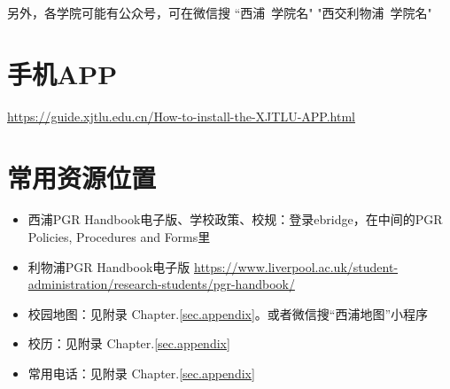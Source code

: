 另外，各学院可能有公众号，可在微信搜 “西浦\ {学院名}" "西交利物浦\ {学院名}"

\section{手机APP}
\url{https://guide.xjtlu.edu.cn/How-to-install-the-XJTLU-APP.html}

\section{常用资源位置}
\begin{itemize}
    \item 西浦PGR Handbook电子版、学校政策、校规：登录ebridge，在中间的PGR Policies, Procedures and Forms里
    \item 利物浦PGR Handbook电子版 \url{https://www.liverpool.ac.uk/student-administration/research-students/pgr-handbook/}
    \item 校园地图：见附录 Chapter.\ref{sec.appendix}。或者微信搜“西浦地图”小程序
    \item 校历：见附录 Chapter.\ref{sec.appendix}
    \item 常用电话：见附录 Chapter.\ref{sec.appendix}
\end{itemize}

